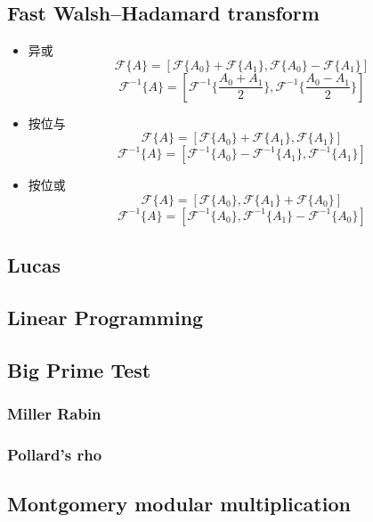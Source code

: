 \subsection{Fast Walsh–Hadamard transform}
\begin{itemize}
\item 异或
$$
\mathcal{F}\{A\} =
\left[\mathcal{F}\{A_0\}+\mathcal{F}\{A_1\},
\mathcal{F}\{A_0\}-\mathcal{F}\{A_1\}\right]
$$
$$
\mathcal{F}^{-1}\{A\} =
\left[
\mathcal{F}^{-1}\{\frac{A_0+A_1}{2}\},
\mathcal{F}^{-1}\{\frac{A_0-A_1}{2}\}
\right]
$$
\item 按位与
$$
\mathcal{F}\{A\} =
\left[\mathcal{F}\{A_0\}+\mathcal{F}\{A_1\},
\mathcal{F}\{A_1\}\right]
$$
$$
\mathcal{F}^{-1}\{A\} =
\left[
\mathcal{F}^{-1}\{A_0\}-\mathcal{F}^{-1}\{A_1\},
\mathcal{F}^{-1}\{A_1\}
\right]
$$
\item 按位或
$$
\mathcal{F}\{A\} =
\left[\mathcal{F}\{A_0\},
\mathcal{F}\{A_1\}+\mathcal{F}\{A_0\}\right]
$$
$$
\mathcal{F}^{-1}\{A\} =
\left[
\mathcal{F}^{-1}\{A_0\},
\mathcal{F}^{-1}\{A_1\}-\mathcal{F}^{-1}\{A_0\}
\right]
$$
\end{itemize}


\subsection{Lucas}


\subsection{Linear Programming}


\subsection{Big Prime Test}

\subsubsection{Miller Rabin}

\subsubsection{Pollard's rho}


\subsection{Montgomery modular multiplication}


